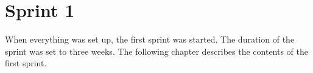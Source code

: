 \chapter{Sprint 1}
When everything was set up, the first sprint was started. The duration of the sprint was set to three weeks. The following chapter describes the contents of the first sprint. 
